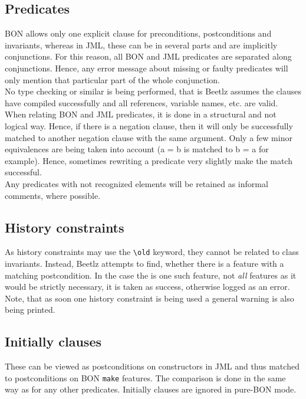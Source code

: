 \documentclass[11pt]{amsart}
\begin{document}
\subsection{Predicates}\hfill \newline
BON allows only one explicit clause for preconditions, postconditions and invariants, whereas in JML, these can be in several parts and are implicitly conjunctions. For this reason, all BON and JML predicates are separated along conjunctions. Hence, any error message about missing or faulty predicates will only mention that particular part of the whole conjunction.\\
No type checking or similar is being performed, that is Beetlz assumes the clauses have compiled successfully and all references, variable names, etc. are valid. When relating BON and JML predicates, it is done in a structural and not logical way. Hence, if there is a negation clause, then it will only be successfully matched to another negation clause with the same argument. Only a few minor equivalences are being taken into account (a = b is matched to b = a for example). Hence, sometimes rewriting a predicate very slightly make the match successful.\\
Any predicates with not recognized elements will be retained as informal comments, where possible.



\subsection{History constraints}\hfill \newline
As history constraints may use the \texttt{\textbackslash old} keyword, they cannot be related to class invariants. Instead, Beetlz attempts to find, whether there is a feature with a matching postcondition. In  the case the is one such feature, not \emph{all} features as it would be strictly necessary, it is taken as success, otherwise logged as an error. Note, that as soon one history constraint is being used a general warning is also being printed.

\subsection{Initially clauses}\hfill \newline
These can be viewed as postconditions on constructors in JML and thus matched to postconditions on BON \texttt{make} features. The comparison is done in the same way as for any other predicates.
Initially clauses are ignored in pure-BON mode.
\end{document}
